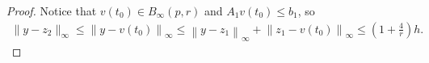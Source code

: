 \documentclass{article}
\theoremstyle{case}
\numberwithin{theorem}{subsection}
\newcommand{\bpr}{{B_{\infty}\left(p, r\right)}}
\newcommand{\Rn}{\mathbb R^n}
\begin{document}
\begin{proof}
Notice that $v(t_0) \in B_{\infty}(p, r)$ and $A_1 v(t_0) \le b_1$,
so
\begin{align*}
\|y - z_2\|_{\infty}
\le \left\|y - v(t_0)\right\|_{\infty}
\le \left\|y - z_1\right\|_{\infty} + \left\|z_1 - v(t_0)\right\|_{\infty}
\le \left(1 + \frac 4 r\right) h.
\end{align*}







% 











\end{proof}
\end{document}
